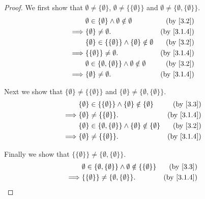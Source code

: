 \begin{proof}
  We first show that \(\emptyset \neq \{\emptyset\}\), \(\emptyset \neq \{\{\emptyset\}\}\) and \(\emptyset \neq \{\emptyset, \{\emptyset\}\}\).
  \begin{align*}
             & \emptyset \in \{\emptyset\} \land \emptyset \notin \emptyset                & \text{(by \cref{3.2})}   \\
    \implies & \{\emptyset\} \neq \emptyset.                                               & \text{(by \cref{3.1.4})} \\
             & \{\emptyset\} \in \{\{\emptyset\}\} \land \{\emptyset\} \notin \emptyset    & \text{(by \cref{3.2})}   \\
    \implies & \{\{\emptyset\}\} \neq \emptyset.                                           & \text{(by \cref{3.1.4})} \\
             & \emptyset \in \{\emptyset, \{\emptyset\}\} \land \emptyset \notin \emptyset & \text{(by \cref{3.2})}   \\
    \implies & \{\emptyset\} \neq \emptyset.                                               & \text{(by \cref{3.1.4})}
  \end{align*}

  Next we show that \(\{\emptyset\} \neq \{\{\emptyset\}\}\) and \(\{\emptyset\} \neq \{\emptyset, \{\emptyset\}\}\).
  \begin{align*}
             & \{\emptyset\} \in \{\{\emptyset\}\} \land \{\emptyset\} \notin \{\emptyset\}            & \text{(by \cref{3.3})}   \\
    \implies & \{\emptyset\} \neq \{\{\emptyset\}\}.                                                   & \text{(by \cref{3.1.4})} \\
             & \{\emptyset\} \in \{\emptyset, \{\emptyset\}\} \land \{\emptyset\} \notin \{\emptyset\} & \text{(by \cref{3.2})}   \\
    \implies & \{\emptyset\} \neq \{\{\emptyset\}\}.                                                   & \text{(by \cref{3.1.4})}
  \end{align*}

  Finally we show that \(\{\{\emptyset\}\} \neq \{\emptyset, \{\emptyset\}\}\).
  \begin{align*}
             & \emptyset \in \{\emptyset, \{\emptyset\}\} \land \emptyset \notin \{\{\emptyset\}\} & \text{(by \cref{3.3})}   \\
    \implies & \{\{\emptyset\}\} \neq \{\emptyset, \{\emptyset\}\}.                                & \text{(by \cref{3.1.4})}
  \end{align*}
\end{proof}

